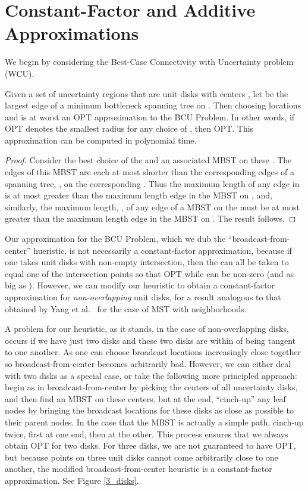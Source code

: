 \makeatletter{}\section{Constant-Factor and Additive Approximations}\label{sec:constant_factor_and_additive_approx}








We begin by considering the Best-Case  Connectivity with Uncertainty problem (WCU).

\begin{lemma} \label{lemma:best_case_opt+1} Given a set of uncertainty regions that are unit disks  with centers , let  be the largest edge of a minimum bottleneck spanning tree on .  Then choosing locations  and  is at worst an OPT approximation to the BCU Problem.  In other words, if OPT denotes the smallest radius  for any choice of , then  OPT.
This approximation can be computed in polynomial time.
\end{lemma}
\begin{proof} Consider the best choice of the  and an associated MBST on these .  The edges of this MBST are each at most  shorter than the corresponding edges of a spanning tree, , on the corresponding .  Thus the maximum length of any edge in  is at most  greater than the maximum length edge in the MBST on , and, similarly, the maximum length, , of any edge of a MBST on the  must be at most  greater than the maximum length edge in the MBST on .  The result follows. 
\end{proof}


Our approximation for the BCU Problem, which we  dub the ``broadcast-from-center'' hueristic, is not necessarily a constant-factor approximation, because if one takes  unit disks with non-empty intersection, then the  can all be taken to equal one of the intersection points so that OPT while  can be non-zero (and as big as ). However, we can modify our heuristic to obtain a constant-factor approximation for {\em non-overlapping} unit disks, for a result analogous to that obtained by Yang et al.~\cite{Yang07} for the case of MST with neighborhoods.

 A problem
for our heuristic, as it stands, in the case of non-overlapping disks, occurs if
we have just two disks and these two disks are within  of being
tangent to one another.  As  one can choose broadcast
locations  increasingly close together so broadcast-from-center becomes
arbitrarily bad.  However, we can either deal with two disks as a special case,
or take the following more principled approach: begin as in
broadcast-from-center by picking the centers of all uncertainty disks, and then
find an MBST on these centers, but at the end, ``cinch-up'' any leaf nodes by
bringing the broadcast locations for these disks as close as possible to their
parent nodes.  In the case that the MBST is actually a simple path, cinch-up
twice, first at one end, then at the other.  This process ensures that we
always obtain OPT for two disks.  For three disks, we are not guaranteed to
have OPT, but because points on three unit disks cannot come arbitrarily close to
one another, the modified broadcast-from-center heuristic is a constant-factor
approximation.  See Figure \ref{3_disks}.

